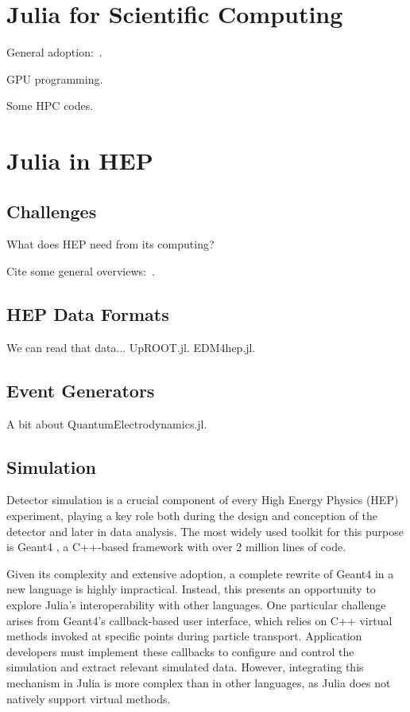 \documentclass{webofc}
\begin{document}
\section{Julia for Scientific Computing}

General adoption:~\cite{perkel-julia-science}.

GPU programming.

Some HPC codes.

\section{Julia in HEP}

\subsection{Challenges}

What does HEP need from its computing?

Cite some general overviews:~\cite{Stanitzki:2020bnx,eschle2023potential}.

\subsection{HEP Data Formats}

We can read that data... UpROOT.jl. EDM4hep.jl.

\subsection{Event Generators}

A bit about QuantumElectrodynamics.jl.

\subsection{Simulation}

Detector simulation is a crucial component of every High Energy Physics (HEP) experiment, playing a key role both during the design and conception of the detector and later in data analysis. The most widely used toolkit for this purpose is Geant4 \cite{GEANT4:2002zbu}, a C++-based framework with over 2 million lines of code.

Given its complexity and extensive adoption, a complete rewrite of Geant4 in a new language is highly impractical. Instead, this presents an opportunity to explore Julia's interoperability with other languages. One particular challenge arises from Geant4's callback-based user interface, which relies on C++ virtual methods invoked at specific points during particle transport. Application developers must implement these callbacks to configure and control the simulation and extract relevant simulated data. However, integrating this mechanism in Julia is more complex than in other languages, as Julia does not natively support virtual methods.
\end{document}
